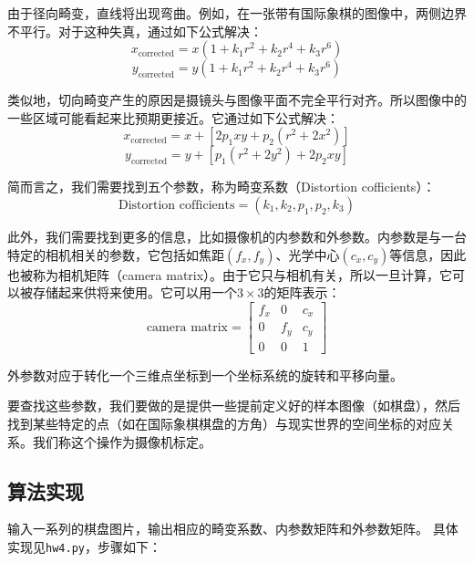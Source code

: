 \documentclass[a4paper, 12pt, UTF8]{article}
\begin{document}
由于径向畸变，直线将出现弯曲。例如，在一张带有国际象棋的图像中，两侧边界不平行。对于这种失真，通过如下公式解决：
$$x_{\text{corrected}} = x ( 1 + k_1 r^2 + k_2 r^4 + k_3 r^6 )$$
$$y_{\text{corrected}} = y ( 1 + k_1 r^2 + k_2 r^4 + k_3 r^6 )$$

类似地，切向畸变产生的原因是摄镜头与图像平面不完全平行对齐。所以图像中的一些区域可能看起来比预期更接近。它通过如下公式解决：
$$x_{\text{corrected}} = x + [ 2p_1xy + p_2 (r^2 + 2x^2) ]$$
$$y_{\text{corrected}} = y + [ p_1(r^2 + 2y^2) + 2p_2xy ]$$

简而言之，我们需要找到五个参数，称为畸变系数（Distortion cofficients）：
$$\text{Distortion cofficients} = (k_1, k_2, p_1, p_2, k_3)$$

此外，我们需要找到更多的信息，比如摄像机的内参数和外参数。内参数是与一台特定的相机相关的参数，它包括如焦距$(f_x, f_y)$、光学中心$(c_x, c_y)$等信息，因此也被称为相机矩阵（camera matrix）。由于它只与相机有关，所以一旦计算，它可以被存储起来供将来使用。它可以用一个$3 \times 3$的矩阵表示：
$$\text{camera matrix} = \begin{bmatrix} f_x & 0 & c_x \\ 0 & f_y & c_y \\ 0 & 0 & 1 \end{bmatrix}$$

外参数对应于转化一个三维点坐标到一个坐标系统的旋转和平移向量。

要查找这些参数，我们要做的是提供一些提前定义好的样本图像（如棋盘），然后找到某些特定的点（如在国际象棋棋盘的方角）与现实世界的空间坐标的对应关系。我们称这个操作为摄像机标定。

\subsection{算法实现}

输入一系列的棋盘图片，输出相应的畸变系数、内参数矩阵和外参数矩阵。
具体实现见\lstinline{hw4.py}，步骤如下：
\end{document}
